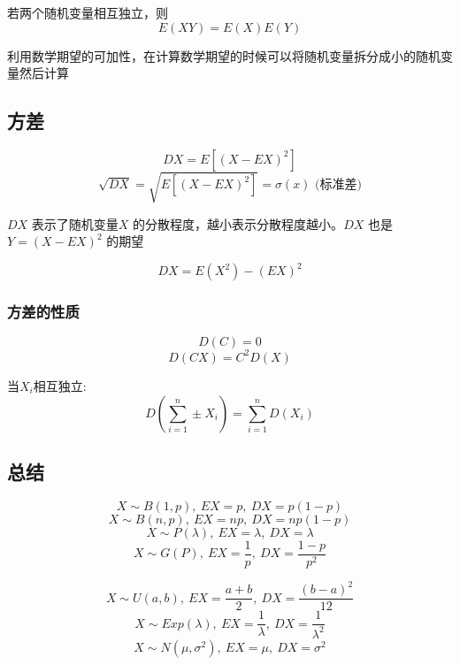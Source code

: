 \documentclass[10pt, a4paper]{article}
\begin{document}
    若两个随机变量相互独立，则
    $$E(XY) = E(X)E(Y)$$

    利用数学期望的可加性，在计算数学期望的时候可以将随机变量拆分成小的随机变量然后计算

    \subsection{方差}
    $$DX = E[(X - EX)^2]$$
    $$\sqrt{DX} = \sqrt{E[(X - EX)^2]} = \sigma(x) \text{ (标准差)}$$
    
    $DX$ 表示了随机变量$X$ 的分散程度，越小表示分散程度越小。$DX$ 也是 $Y = (X - EX)^2$ 的期望

    $$DX = E(X^2) - (EX)^2$$

    \subsubsection{方差的性质}   
    $$D(C) = 0$$
    $$D(CX) = C^2D(X)$$

    当$X_i$相互独立:
    $$D(\sum_{i = 1}^n \pm X_i) = \sum_{i = 1}^nD(X_i)$$
    $$$$

    \subsection{总结}
    $$X \sim B(1, p),\ EX = p,\ DX = p(1 - p)$$
    $$X \sim B(n, p),\ EX = np,\ DX = np(1 - p)$$
    $$X \sim P(\lambda),\ EX = \lambda,\ DX = \lambda$$
    $$X \sim G(P),\ EX = \frac{1}{p},\ DX = \frac{1 - p}{p^2}$$
    
    $$X \sim U(a, b),\ EX = \frac{a + b}{2},\ DX = \frac{(b - a)^2}{12}$$
    $$X \sim Exp(\lambda),\ EX = \frac{1}{\lambda},\ DX = \frac{1}{\lambda^2}$$
    $$X \sim N(\mu, \sigma^2),\ EX = \mu,\ DX = \sigma^2$$



        \newpage
\section{}
        
\end{document}
